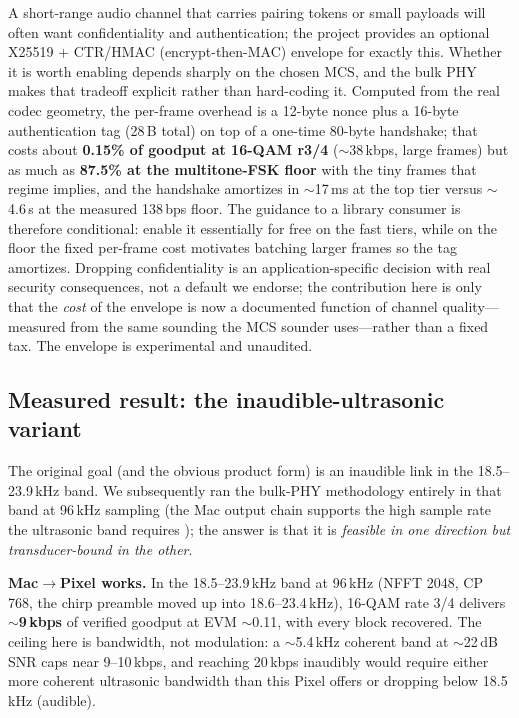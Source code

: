\documentclass[11pt]{article}
\begin{document}
A short-range audio channel that carries pairing tokens or small payloads will
often want confidentiality and authentication; the project provides an optional
X25519 + CTR/HMAC (encrypt-then-MAC) envelope for exactly this. Whether it is
worth enabling depends sharply on the chosen MCS, and the bulk PHY makes that
tradeoff explicit rather than hard-coding it. Computed from the real codec
geometry, the per-frame overhead is a 12-byte nonce plus a 16-byte
authentication tag (28\,B total) on top of a one-time 80-byte handshake; that
costs about \textbf{0.15\% of goodput at 16-QAM r3/4} ($\sim$38\,kbps, large
frames) but as much as \textbf{87.5\% at the multitone-FSK floor} with the tiny
frames that regime implies, and the handshake amortizes in $\sim$17\,ms at the
top tier versus $\sim$4.6\,s at the measured 138\,bps floor. The guidance to a library consumer is
therefore conditional: enable it essentially for free on the fast tiers, while on
the floor the fixed per-frame cost motivates batching larger frames so the tag
amortizes. Dropping confidentiality is an application-specific decision with real
security consequences, not a default we endorse; the contribution here is only
that the \emph{cost} of the envelope is now a documented function of channel
quality---measured from the same sounding the MCS sounder uses---rather than a
fixed tax. The envelope is experimental and unaudited.

\subsection{Measured result: the inaudible-ultrasonic variant}
\label{sec:ultrasonic}

The original goal (and the obvious product form) is an inaudible link in the
18.5--23.9\,kHz band. We subsequently ran the bulk-PHY methodology entirely in
that band at 96\,kHz sampling \cite{ultrasonicband} (the Mac output chain
supports the high sample rate the ultrasonic band requires \cite{applerates});
the answer is that it is
\emph{feasible in one direction but transducer-bound in the other}.

\textbf{Mac$\rightarrow$Pixel works.} In the 18.5--23.9\,kHz band at 96\,kHz
(NFFT 2048, CP 768, the chirp preamble moved up into 18.6--23.4\,kHz),
16-QAM rate 3/4 delivers \textbf{$\sim$9\,kbps} of verified goodput at
EVM $\sim$0.11, with every block recovered. The ceiling here is bandwidth, not
modulation: a $\sim$5.4\,kHz coherent band at $\sim$22\,dB SNR caps near
9--10\,kbps, and reaching 20\,kbps inaudibly would require either more coherent
ultrasonic bandwidth than this Pixel offers or dropping below 18.5\,kHz
(audible).
\end{document}
